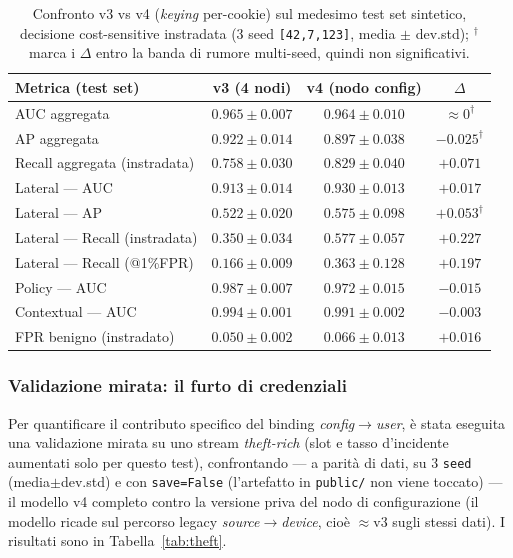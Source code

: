 \begin{table}[ht!]
\centering
\footnotesize
\renewcommand{\arraystretch}{1.4}
\setlength{\tabcolsep}{5pt}
\begin{tabular}{l c c c}
\hline
\textbf{Metrica (test set)} & \textbf{v3 (4 nodi)} & \textbf{v4 (nodo config)} & $\Delta$ \\
\hline
AUC aggregata                    & $\mathbf{0.965}\pm0.007$ & $0.964\pm0.010$ & $\approx\!0^{\dagger}$ \\
AP aggregata                     & $\mathbf{0.922}\pm0.014$ & $0.897\pm0.038$ & $-0.025^{\dagger}$ \\
Recall aggregata (instradata)    & $0.758\pm0.030$ & $\mathbf{0.829}\pm0.040$ & $+0.071$ \\
\hline
Lateral --- AUC                  & $0.913\pm0.014$ & $\mathbf{0.930}\pm0.013$ & $+0.017$ \\
Lateral --- AP                   & $0.522\pm0.020$ & $\mathbf{0.575}\pm0.098$ & $+0.053^{\dagger}$ \\
Lateral --- Recall (instradata)  & $0.350\pm0.034$ & $\mathbf{0.577}\pm0.057$ & $+0.227$ \\
Lateral --- Recall (@1\%FPR)     & $0.166\pm0.009$ & $\mathbf{0.363}\pm0.128$ & $+0.197$ \\
\hline
Policy --- AUC                   & $\mathbf{0.987}\pm0.007$ & $0.972\pm0.015$ & $-0.015$ \\
Contextual --- AUC               & $\mathbf{0.994}\pm0.001$ & $0.991\pm0.002$ & $-0.003$ \\
\hline
FPR benigno (instradato)         & $\mathbf{0.050}\pm0.002$ & $0.066\pm0.013$ & $+0.016$ \\
\hline
\end{tabular}
\caption{Confronto v3 vs v4 (\textit{keying} per-cookie) sul medesimo test set sintetico, decisione cost-sensitive instradata (3 seed \texttt{[42,7,123]}, media $\pm$ dev.std); $^{\dagger}$ marca i $\Delta$ entro la banda di rumore multi-seed, quindi non significativi.}
\label{tab:v3v4}
\end{table}

\subsubsection{Validazione mirata: il furto di credenziali}

Per quantificare il contributo specifico del binding \textit{config}$\rightarrow$\textit{user}, è stata eseguita una validazione mirata su uno stream \emph{theft-rich} (slot e tasso d'incidente aumentati solo per questo test), confrontando --- a parità di dati, su 3 \texttt{seed} (media$\pm$dev.std) e con \texttt{save=False} (l'artefatto in \texttt{public/} non viene toccato) --- il modello v4 completo contro la versione priva del nodo di configurazione (il modello ricade sul percorso legacy \textit{source}$\rightarrow$\textit{device}, cioè $\approx$v3 sugli stessi dati). I risultati sono in Tabella~\ref{tab:theft}.

